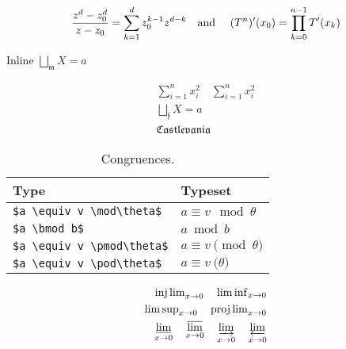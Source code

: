 \documentclass{amsart}
\numberwithin{equation}{section}
\begin{document}
\[
    \frac{z^d - z_0^d}{z - z_0} = \sum_{k=1}^d z_0^{k-1}z^{d-k} \text{\quad and \quad}
    (T^n)'(x_0) = \prod_{k=0}^{n-1} T'(x_k)
\]

Inline $\bigsqcup\limits_\mathfrak m X = a$

\begin{align*}
    \sum\nolimits_{i=1}^n x_i^2 \quad \sum_{i=1}^n x_i^2\\
    \bigsqcup\nolimits_\mathfrak f X = a\\
    \mathfrak{Castlevania}
\end{align*}

\begin{table}[h]
    \begin{center}
        \begin{tabular}{ll}
            \hline
            Type &Typeset\\\hline
            \verb+$a \equiv v \mod\theta$+ &$a \equiv v \mod\theta$\\
            \verb+$a \bmod b$+ &$a \bmod b$\\
            \verb+$a \equiv v \pmod\theta$+ &$a \equiv v \pmod\theta$\\
            \verb+$a \equiv v \pod\theta$+ &$a \equiv v \pod\theta$\\
            \hline
        \end{tabular}
        \caption{Congruences.}
    \end{center}
\end{table}

\begin{align*}
    \injlim\nolimits_{x \to 0} \quad \liminf\nolimits_{x \to 0}\\
    \limsup\nolimits_{x \to 0} \quad \projlim\nolimits_{x \to 0}\\
    \varliminf_{x \to 0} \quad \varlimsup_{x \to 0} \quad
    \varinjlim_{x \to 0} \quad \varprojlim_{x \to 0}
\end{align*}
\end{document}
